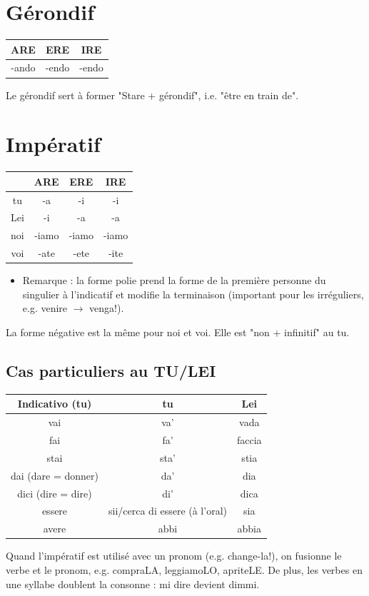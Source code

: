 \documentclass[12pt, openany]{report}
\begin{document}
\section{Gérondif}
\begin{center}
    \begin{tabular}{c|c|c}
        ARE & ERE & IRE\\ \hline 
        -ando & -endo & -endo\\
    \end{tabular}
\end{center}
Le gérondif sert à former "Stare + gérondif", i.e. "être en train de".
\section{Impératif}
\begin{center}
    \begin{tabular}{c|c|c|c}
        & ARE & ERE & IRE\\ \hline
        tu & -a & -i & -i \\
        Lei & -i & -a & -a\\
        noi & -iamo & -iamo & -iamo \\
        voi & -ate & -ete & -ite \\
    \end{tabular}
\end{center}
\begin{itemize}
    \item [$\rightarrow$] Remarque : la forme polie prend la forme de la première personne du singulier à l'indicatif et modifie la terminaison (important pour les irréguliers, e.g. venire $\rightarrow$ venga!).
\end{itemize}
La forme négative est la même pour noi et voi. Elle est "non + infinitif" au tu. 
\subsection{Cas particuliers au TU/LEI}
\begin{center}
    \begin{tabular}{c|c|c}
        Indicativo (tu) & tu & Lei\\ \hline 
        vai & va' & vada \\
        fai & fa' & faccia \\
        stai & sta' & stia \\
        dai (dare = donner) & da' & dia \\
        dici (dire = dire) & di' & dica \\
        essere & sii/cerca di essere (à l'oral) & sia\\
        avere & abbi & abbia\\ 
    \end{tabular}
\end{center}
Quand l'impératif est utilisé avec un pronom (e.g. change-la!), on fusionne le verbe et le pronom, e.g. compraLA, leggiamoLO, apriteLE. De plus, les verbes en une syllabe doublent la consonne : mi dire devient dimmi.
\end{document}
